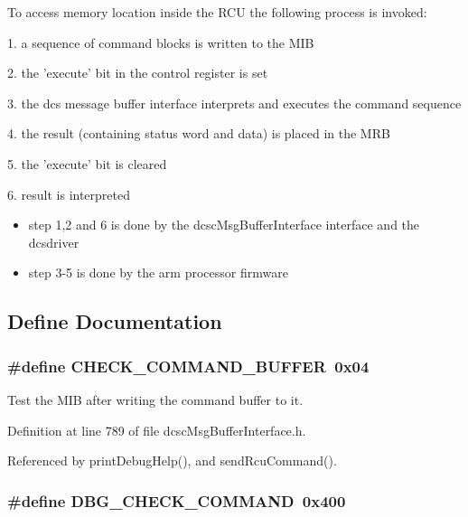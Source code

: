 To access memory location inside the RCU the following process is invoked:\par
 1. a sequence of command blocks is written to the MIB\par
 2. the 'execute' bit in the control register is set\par
 3. the dcs message buffer interface interprets and executes the command sequence\par
 4. the result (containing status word and data) is placed in the MRB\par
 5. the 'execute' bit is cleared\par
 6. result is interpreted\par
\begin{itemize}
\item step 1,2 and 6 is done by the dcsc\-Msg\-Buffer\-Interface interface and the dcsdriver\item step 3-5 is done by the arm processor firmware \end{itemize}


\subsection{Define Documentation}
\hypertarget{group__dcsc__msg__buffer__access_g9eba95d21cfe8d57e7d52cadc13e1b91}{
\subsubsection[CHECK\_\-COMMAND\_\-BUFFER]{\setlength{\rightskip}{0pt plus 5cm}\#define CHECK\_\-COMMAND\_\-BUFFER~0x04}}
\label{group__dcsc__msg__buffer__access_g9eba95d21cfe8d57e7d52cadc13e1b91}


Test the MIB after writing the command buffer to it. 



Definition at line 789 of file dcsc\-Msg\-Buffer\-Interface.h.

Referenced by print\-Debug\-Help(), and send\-Rcu\-Command().\hypertarget{group__dcsc__msg__buffer__access_g7eaf88fd984d7f7c8c760dce4cb355d1}{
\subsubsection[DBG\_\-CHECK\_\-COMMAND]{\setlength{\rightskip}{0pt plus 5cm}\#define DBG\_\-CHECK\_\-COMMAND~0x400}}
\label{group__dcsc__msg__buffer__access_g7eaf88fd984d7f7c8c760dce4cb355d1}


